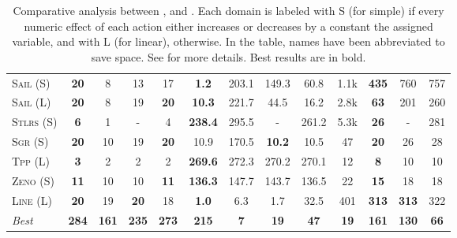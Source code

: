 \documentclass[11pt]{article}
\begin{document}
\begin{table*}[tb]
{\begin{tabular}{|l||cccc||cccc||cccc||}
\textsc{Sail} (S)&\textbf{20}&8&13&17&\textbf{1.2}&203.1&149.3&60.8&1.1k&\textbf{435}&760&757\\
\textsc{Sail} (L)&\textbf{20}&8&19&\textbf{20}&\textbf{10.3}&221.7&44.5&16.2&2.8k&\textbf{63}&201&260\\
\textsc{Stlrs} (S)&\textbf{6}&1&-&4&\textbf{238.4}&295.5&-&261.2&5.3k&\textbf{26}&-&281\\
\textsc{Sgr} (S)&\textbf{20}&10&19&\textbf{20}&10.9&170.5&\textbf{10.2}&10.5&47&\textbf{20}&26&28\\
\textsc{Tpp} (L)&\textbf{3}&2&2&2&\textbf{269.6}&272.3&270.2&270.1&12&\textbf{8}&10&10\\
\textsc{Zeno} (S)&\textbf{11}&10&10&\textbf{11}&\textbf{136.3}&147.7&143.7&136.5&22&\textbf{15}&18&18\\
\textsc{Line} (L)&\textbf{20}&19&\textbf{20}&18&\textbf{1.0}&6.3&1.7&32.5&401&\textbf{313}&\textbf{313}&322
\\\hline
\textit{Best}&\textbf{284}&\textbf{161}&\textbf{235}&\textbf{273}&\textbf{215}&\textbf{7}&\textbf{19}&\textbf{47}&\textbf{19}&\textbf{161}&\textbf{130}&\textbf{66}\\\hline

        \end{tabular}}
        \caption{Comparative analysis between  \pattye, \pattym and \pattyi. Each domain is labeled with S (for simple) if every numeric effect of each action either increases or decreases by a constant the assigned variable, and with L (for linear), otherwise. In the table, names have been abbreviated to save space.  See \cite{ipc2023} for more details. Best results are in bold.}
        \label{tab:qual-plans}
        \end{table*}
        
\end{document}
